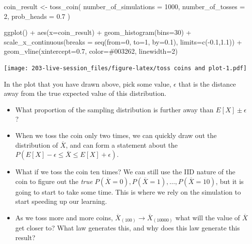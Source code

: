 \documentclass[
]{book}
\newenvironment{Shaded}{\begin{snugshade}}{\end{snugshade}}
\newcommand{\AttributeTok}[1]{\textcolor[rgb]{0.77,0.63,0.00}{#1}}
\newcommand{\DecValTok}[1]{\textcolor[rgb]{0.00,0.00,0.81}{#1}}
\newcommand{\FloatTok}[1]{\textcolor[rgb]{0.00,0.00,0.81}{#1}}
\newcommand{\FunctionTok}[1]{\textcolor[rgb]{0.00,0.00,0.00}{#1}}
\newcommand{\NormalTok}[1]{#1}
\newcommand{\OtherTok}[1]{\textcolor[rgb]{0.56,0.35,0.01}{#1}}
\newcommand{\SpecialCharTok}[1]{\textcolor[rgb]{0.00,0.00,0.00}{#1}}
\newcommand{\StringTok}[1]{\textcolor[rgb]{0.31,0.60,0.02}{#1}}
\providecommand{\tightlist}{%
  \setlength{\itemsep}{0pt}\setlength{\parskip}{0pt}}
\theoremstyle{definition}
\theoremstyle{definition}
\theoremstyle{definition}
\theoremstyle{definition}
\theoremstyle{remark}
\begin{document}
\begin{Shaded}
\begin{Highlighting}[]
\NormalTok{coin\_result }\OtherTok{\textless{}{-}} \FunctionTok{toss\_coin}\NormalTok{(}
  \AttributeTok{number\_of\_simulations =} \DecValTok{1000}\NormalTok{,}
  \AttributeTok{number\_of\_tosses =} \DecValTok{2}\NormalTok{, }
  \AttributeTok{prob\_heads =} \FloatTok{0.7}
\NormalTok{  )}

\FunctionTok{ggplot}\NormalTok{() }\SpecialCharTok{+} 
    \FunctionTok{aes}\NormalTok{(}\AttributeTok{x=}\NormalTok{coin\_result) }\SpecialCharTok{+} 
    \FunctionTok{geom\_histogram}\NormalTok{(}\AttributeTok{bins=}\DecValTok{30}\NormalTok{) }\SpecialCharTok{+} 
    \FunctionTok{scale\_x\_continuous}\NormalTok{(}\AttributeTok{breaks =} \FunctionTok{seq}\NormalTok{(}\AttributeTok{from=}\DecValTok{0}\NormalTok{, }\AttributeTok{to=}\DecValTok{1}\NormalTok{, }\AttributeTok{by=}\FloatTok{0.1}\NormalTok{), }\AttributeTok{limits=}\FunctionTok{c}\NormalTok{(}\SpecialCharTok{{-}}\FloatTok{0.1}\NormalTok{,}\FloatTok{1.1}\NormalTok{)) }\SpecialCharTok{+} 
    \FunctionTok{geom\_vline}\NormalTok{(}\AttributeTok{xintercept=}\FloatTok{0.7}\NormalTok{, }\AttributeTok{color=}\StringTok{\textquotesingle{}\#003262\textquotesingle{}}\NormalTok{, }\AttributeTok{linewidth=}\DecValTok{2}\NormalTok{)}
\end{Highlighting}
\end{Shaded}

\texttt{[image: 203-live-session\_files/figure-latex/toss coins and plot-1.pdf]}

In the plot that you have drawn above, pick some value, \(\epsilon\) that is the distance away from the true expected value of this distribution.

\begin{itemize}
\tightlist
\item
  What proportion of the sampling distribution is further away than \(E[X] \pm \epsilon\)?
\item
  When we toss the coin only two times, we can quickly draw out the distribution of \(\overline{X}\), and can form a statement about the \(P(E[X] - \epsilon \leq \overline{X} \leq E[X] + \epsilon)\).
\item
  What if we toss the coin ten times? We can still use the IID nature of the coin to figure out the \emph{true} \(P(\overline{X} = 0), P(\overline{X} = 1), \dots, P(\overline{X} = 10)\), but it is going to start to take some time. This is where we rely on the simulation to start speeding up our learning.
\item
  As we toss more and more coins, \(\overline X_{(100)} \rightarrow \overline X_{(10000)}\) what will the value of \(\overline X\) get closer to? What law generates this, and why does this law generate this result?
\end{itemize}
\end{document}
